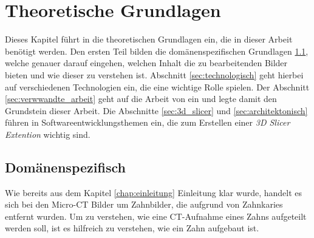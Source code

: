\chapter{Theoretische Grundlagen}
\label{chap:theoretische_grundlagen} Dieses Kapitel führt in die theoretischen Grundlagen
ein, die in dieser Arbeit benötigt werden. Den ersten Teil bilden die domänenspezifischen
Grundlagen \ref{sec:domänenspezifisch}, welche genauer darauf eingehen, welchen Inhalt
die zu bearbeitenden Bilder bieten und wie dieser zu verstehen ist. Abschnitt
\ref{sec:technologisch} geht hierbei auf verschiedenen Technologien ein, die eine
wichtige Rolle spielen. Der Abschnitt \ref{sec:verwwandte_arbeit} geht auf die
Arbeit von \citet{hoffmann2020} ein und legte damit den Grundstein dieser Arbeit.
Die Abschnitte \ref{sec:3d_slicer} und \ref{sec:architektonisch} führen in
Softwareentwicklungsthemen ein, die zum Erstellen einer \textit{3D Slicer
Extention} wichtig sind.

\section{Domänenspezifisch}
\label{sec:domänenspezifisch} Wie bereits aus dem Kapitel \ref{chap:einleitung}
Einleitung klar wurde, handelt es sich bei den Micro-CT Bilder um Zahnbilder,
die aufgrund von Zahnkaries entfernt wurden. Um zu verstehen, wie eine CT-Aufnahme
eines Zahns aufgeteilt werden soll, ist es hilfreich zu verstehen, wie ein Zahn
aufgebaut ist.


